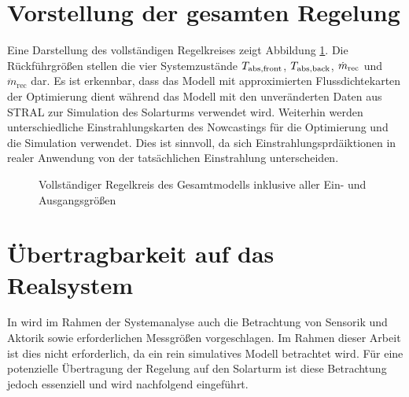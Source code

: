 \section{Vorstellung der gesamten Regelung} \label{sec_VorstelungRegelung}
Eine Darstellung des vollständigen Regelkreises zeigt Abbildung \ref{fig_Regelkreisvollst}.
Die Rückführgrößen stellen die vier Systemzustände $T_{\mathrm{abs,front}}$, $T_{\mathrm{abs,back}}$, $\dot{m}_{\mathrm{rec}}$ und $\ddot{m}_{\mathrm{rec}}$ dar.
Es ist erkennbar, dass das Modell mit approximierten Flussdichtekarten der Optimierung dient während das Modell mit den unveränderten Daten aus STRAL zur Simulation des Solarturms verwendet wird.
Weiterhin werden unterschiedliche Einstrahlungskarten des Nowcastings für die Optimierung und die Simulation verwendet.
Dies ist sinnvoll, da sich Einstrahlungsprdäiktionen in realer Anwendung von der tatsächlichen Einstrahlung unterscheiden.

\begin{figure}[h!]
   \centering
   \setlength{\fboxsep}{1pt}
   \setlength{\fboxrule}{1pt}
   \caption[Vollständiger Regelkreis des Gesamtmodells inklusive aller Ein- und Ausgangsgrößen]{Vollständiger Regelkreis des Gesamtmodells inklusive aller Ein- und Ausgangsgrößen}
   \label{fig_Regelkreisvollst}
\end{figure}


\section{Übertragbarkeit auf das Realsystem} \label{sec_RealsystemRegelung}
In \cite[S.1]{Skogestad} wird im Rahmen der Systemanalyse auch die Betrachtung von Sensorik und Aktorik sowie erforderlichen Messgrößen vorgeschlagen.
Im Rahmen dieser Arbeit ist dies nicht erforderlich, da ein rein simulatives Modell betrachtet wird.
Für eine potenzielle Übertragung der Regelung auf den Solarturm ist diese Betrachtung jedoch essenziell und wird nachfolgend eingeführt.

